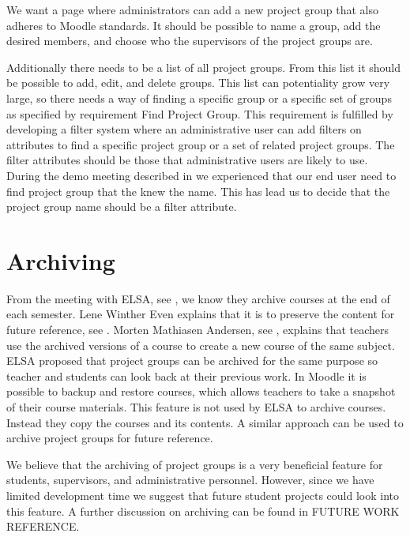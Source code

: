We want a page where administrators can add a new project group that also adheres to Moodle standards.
It should be possible to name a group, add the desired members, and choose who the supervisors of the project groups are.

Additionally there needs to be a list of all project groups.
From this list it should be possible to add, edit, and delete groups. 
This list can potentiality grow very large, so there needs a way of finding a specific group or a specific set of groups as specified by requirement Find Project Group.
This requirement is fulfilled by developing a filter system where an administrative user can add filters on attributes to find a specific project group or a set of related project groups.
The filter attributes should be those that administrative users are likely to use.
During the demo meeting described in  we experienced that our end user need to find project group that the knew the name.
This has lead us to decide that the project group name should be a filter attribute.



\section{Archiving}
\label{sub:analysarchiving}
From the meeting with ELSA, see , we know they archive courses at the end of each semester. 
Lene Winther Even explains that it is to preserve the content for future reference, see . 
Morten Mathiasen Andersen, see , explains that teachers use the archived versions of a course to create a new course of the same subject. 
ELSA proposed that project groups can be archived for the same purpose so teacher and students can look back at their previous work.
In Moodle it is possible to backup and restore courses, which allows teachers to take a snapshot of their course materials. 
This feature is not used by ELSA to archive courses.
Instead they copy the courses and its contents.
A similar approach can be used to archive project groups for future reference. 

We believe that the archiving of project groups is a very beneficial feature for students, supervisors, and administrative personnel.
However, since we have limited development time we suggest that future student projects could look into this feature.
A further discussion on archiving can be found in FUTURE WORK REFERENCE. 
